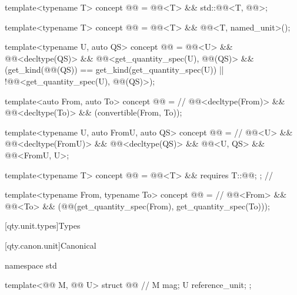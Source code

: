 \begin{itemdecl}
template<typename T>
concept @@ = @@<T> && std::@@<T, @@>;

template<typename T>
concept @@ = @@<T> && @@<T, named_unit>();

template<typename U, auto QS>
concept @@ =
  @@<U> && @@<decltype(QS)> &&
  @@<get_quantity_spec(U{}), @@(QS)> &&
  (get_kind(@@(QS)) == get_kind(get_quantity_spec(U{})) ||
   !@@<get_quantity_spec(U{}), @@(QS)>);

template<auto From, auto To>
concept @@ =                                     // \expos
  @@<decltype(From)> && @@<decltype(To)> && (convertible(From, To));

template<typename U, auto FromU, auto QS>
concept @@ =                                    // \expos
  @@<U> && @@<decltype(FromU)> && @@<decltype(QS)> &&
  @@<U, QS> && @@<FromU, U{}>;

template<typename T>
concept @@ = @@<T> && requires { T::@@; };  // \expos

template<typename From, typename To>
concept @@ =                              // \expos
  @@<From> && @@<To> &&
  (@@(get_quantity_spec(From{}), get_quantity_spec(To{})));
\end{itemdecl}

[qty.unit.types]{Types}

[qty.canon.unit]{Canonical}

\begin{codeblock}
namespace std {

template<@@ M, @@ U>
struct @@ {  // \expos
  M mag;
  U reference_unit;
};

}
\end{codeblock}

